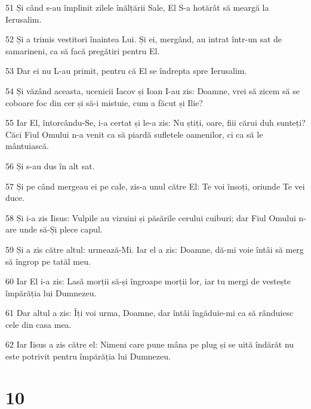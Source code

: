 \par 51 Și când s-au împlinit zilele înălțării Sale, El S-a hotărât să meargă la Ierusalim.
\par 52 Și a trimis vestitori înaintea Lui. Și ei, mergând, au intrat într-un sat de samarineni, ca să facă pregătiri pentru El.
\par 53 Dar ei nu L-au primit, pentru că El se îndrepta spre Ierusalim.
\par 54 Și văzând aceasta, ucenicii Iacov și Ioan I-au zis: Doamne, vrei să zicem să se coboare foc din cer și să-i mistuie, cum a făcut și Ilie?
\par 55 Iar El, întorcându-Se, i-a certat și le-a zis: Nu știți, oare, fiii cărui duh sunteți? Căci Fiul Omului n-a venit ca să piardă sufletele oamenilor, ci ca să le mântuiască.
\par 56 Și s-au dus în alt sat.
\par 57 Și pe când mergeau ei pe cale, zis-a unul către El: Te voi însoți, oriunde Te vei duce.
\par 58 Și i-a zis Iisus: Vulpile au vizuini și păsările cerului cuiburi; dar Fiul Omului n-are unde să-Și plece capul.
\par 59 Și a zis către altul: urmează-Mi. Iar el a zis: Doamne, dă-mi voie întâi să merg să îngrop pe tatăl meu.
\par 60 Iar El i-a zis: Lasă morții să-și îngroape morții lor, iar tu mergi de vestește împărăția lui Dumnezeu.
\par 61 Dar altul a zis: Îți voi urma, Doamne, dar întâi îngăduie-mi ca să rânduiesc cele din casa mea.
\par 62 Iar Iisus a zis către el: Nimeni care pune mâna pe plug și se uită îndărăt nu este potrivit pentru împărăția lui Dumnezeu.

\chapter{10}

